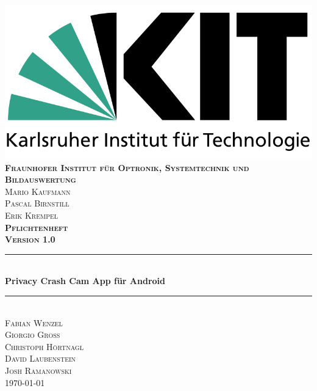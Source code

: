 \begin{titlepage}

\begin{center}

\includegraphics[width=0.5\linewidth]{subtopicsFuncspec/Res/KITLogo.png}\\[0.5cm]
  

\textsc{\bfseries Fraunhofer Institut für Optronik, Systemtechnik und Bildauswertung}\\[0.5cm]
\textsc{Mario Kaufmann\\Pascal Birnstill\\Erik Krempel}\\[2cm]

\textsc{\LARGE \bfseries Pflichtenheft}\\[0.5cm]
\textsc{\bfseries Version 1.0}\\[0.2cm]


\newcommand{\HRule}{\rule{\linewidth}{0.5mm}} 
{\color{mintgreen}\HRule} \\[0.4cm]
{\huge \bfseries Privacy Crash Cam App für Android}\\[0.4cm]
{\color{mintgreen}\HRule} \\[1cm]

\textsc{\Large Fabian Wenzel\\ Giorgio Groß\\ Christoph Hörtnagl\\ David Laubenstein\\[0.15cm]Josh Ramanowski} \\[2cm]

{\large \today}

\end{center}

\end{titlepage}